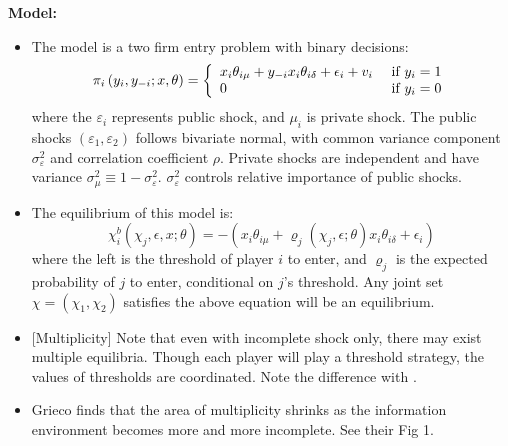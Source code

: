\documentclass{book}
\theoremstyle{plain}
\theoremstyle{definition}
\newcommand{\mytitle}[1]{{\large{\textbf{#1}}}}
\begin{document}
\mytitle{Model:}
\begin{itemize}
	\item The model is a two firm entry problem with binary decisions:
	\[\pi _ { i } \left( y _ { i } , y _ { - i } ; x , \theta \right) = \left\{ \begin{array} { l l } { x _ { i } \theta _ { i \mu } + y _ { - i } x _ { i } \theta _ { i \delta } + \epsilon _ { i } + v _ { i } } & { \text { if } y _ { i } = 1 } \\ { 0 } & { \text { if } y _ { i } = 0 } \end{array} \right.\]
	where the $\varepsilon_i$ represents public shock, and $\mu_i$ is private shock.
	The public shocks $(\varepsilon_1, \varepsilon_2)$ follows bivariate normal, with common variance component $\sigma^2_\varepsilon$ and correlation coefficient $\rho$.
	Private shocks are independent and have variance $\sigma^2_\mu \equiv 1- \sigma^2_\varepsilon$.
	$\sigma^2_\varepsilon$ controls relative importance of public shocks.

	\item The equilibrium of this model is:
	\[\chi _ { i } ^ { b } \left( \chi _ { j } , \epsilon , x ; \theta \right) = - \left( x _ { i } \theta _ { i \mu } + \varrho _ { j } \left( \chi _ { j } , \epsilon ; \theta \right) x _ { i } \theta _ { i \delta } + \epsilon _ { i } \right)\]
	where the left is the threshold of player $i$ to enter, and $\varrho_j$ is the expected probability of $j$ to enter, conditional on $j$'s threshold.
	Any joint set $\chi = \left( \chi _ { 1 } , \chi _ { 2 } \right)$ satisfies the above equation will be an equilibrium. 

	\item {[Multiplicity]} Note that even with incomplete shock only, there may exist multiple equilibria. Though each player will play a threshold strategy, the values of thresholds are coordinated. Note the difference with \cite{Seim:2006em}.

	\item Grieco finds that the area of multiplicity shrinks as the information environment becomes more and more incomplete. See their Fig 1.
\end{itemize}
\end{document}

